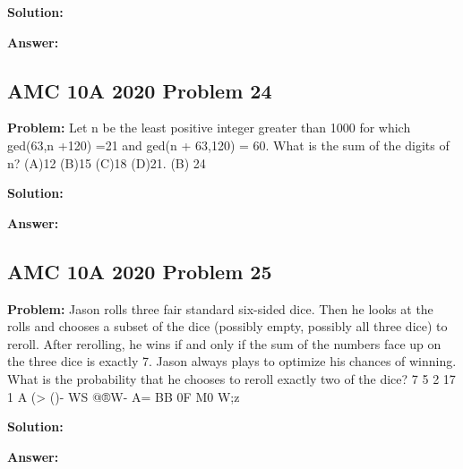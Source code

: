 \documentclass{article}
\newenvironment{problem}{\textbf{Problem: }}{\\}
\newenvironment{solution}{\textbf{Solution: }}{\\}
\newenvironment{answer}{\textbf{Answer: }}{\\}
\begin{document}
\begin{solution}
\end{solution}

\begin{answer}
\end{answer}

\subsection{AMC 10A 2020 Problem 24}

\begin{problem}
Let n be the least positive integer greater than 1000 for which ged(63,n +120) =21 and ged(n + 63,120) = 60. What is the sum of the digits of n? (A)12 (B)15 (C)18 (D)21. (B) 24
\end{problem}

\begin{solution}
\end{solution}

\begin{answer}
\end{answer}

\subsection{AMC 10A 2020 Problem 25}

\begin{problem}
Jason rolls three fair standard six-sided dice. Then he looks at the rolls and chooses a subset of the dice (possibly empty, possibly all three dice) to reroll. After rerolling, he wins if and only if the sum of the numbers face up on the three dice is exactly 7. Jason always plays to optimize his chances of winning. What is the probability that he chooses to reroll exactly two of the dice? 7 5 2 17 1 A (> ()- WS @®W- A= BB 0F M0 W;z
\end{problem}

\begin{solution}
\end{solution}

\begin{answer}
\end{answer}
\end{document}
